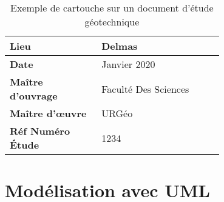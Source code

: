 \par    
\begin{table}
        \centering
        \begin{tabular}{|p{0.30\linewidth}|p{0.40\linewidth}|}
                \hline
                \textbf{Lieu} & Delmas \\
                \hline
                \textbf{Date} & Janvier 2020 \\
                \hline
                \textbf{Maître d'ouvrage} & Faculté Des Sciences \\
                \hline
                \textbf{Maître d'œuvre} & URGéo \\
                \hline
                \textbf{Réf Numéro Étude} & 1234 \\
                \hline
        \end{tabular}
        \caption{Exemple de cartouche sur un document d'étude géotechnique} \label{tab:example_cartouche}
\end{table}
\par

        \section{Modélisation avec UML}
        
        

